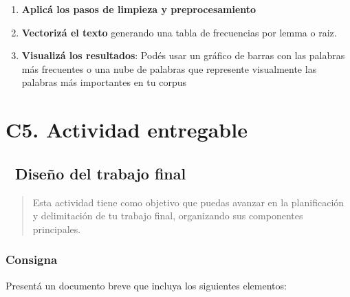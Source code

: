 \documentclass[
  letterpaper,
  DIV=11,
  numbers=noendperiod]{scrreprt}
\providecommand{\tightlist}{%
  \setlength{\itemsep}{0pt}\setlength{\parskip}{0pt}}
\begin{document}
\begin{enumerate}
\def\labelenumi{\arabic{enumi}.}
\tightlist
\item
  \textbf{Aplicá los pasos de limpieza y preprocesamiento}
\item
  \textbf{Vectorizá el texto} generando una tabla de frecuencias por
  lemma o raiz.
\item
  \textbf{Visualizá los resultados}: Podés usar un gráfico de barras con
  las palabras más frecuentes o una nube de palabras que represente
  visualmente las palabras más importantes en tu corpus
\end{enumerate}

\chapter{C5. Actividad entregable}\label{c5.-actividad-entregable}

\section{📄 Diseño del trabajo final}\label{diseuxf1o-del-trabajo-final}

\begin{quote}
Esta actividad tiene como objetivo que puedas avanzar en la
planificación y delimitación de tu trabajo final, organizando sus
componentes principales.
\end{quote}

\subsection{Consigna}\label{consigna}

Presentá un documento breve que incluya los siguientes elementos:
\end{document}

